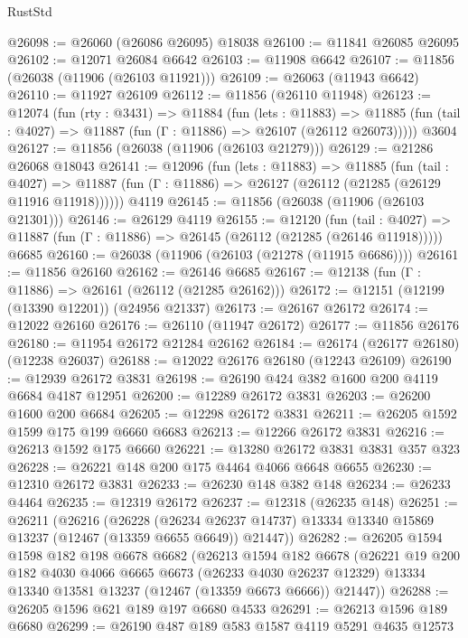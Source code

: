 \begin{lexlean}{RustStd}
\begin{coremodule}
@26098 := @26060 (@26086 @26095) @18038
@26100 := @11841 @26085 @26095
@26102 := @12071 @26084 @6642
@26103 := @11908 @6642
@26107 := @11856 (@26038 (@11906 (@26103 @11921)))
@26109 := @26063 (@11943 @6642)
@26110 := @11927 @26109
@26112 := @11856 (@26110 @11948)
@26123 := @12074
    (fun (rty : @3431) =>
    @11884
      (fun (lets : @11883) =>
      @11885 (fun (tail : @4027) => @11887 (fun (Γ : @11886) => @26107 (@26112 @26073)))))
    @3604
@26127 := @11856 (@26038 (@11906 (@26103 @21279)))
@26129 := @21286 @26068 @18043
@26141 := @12096
    (fun (lets : @11883) =>
    @11885
      (fun (tail : @4027) =>
      @11887 (fun (Γ : @11886) => @26127 (@26112 (@21285 (@26129 @11916 @11918))))))
    @4119
@26145 := @11856 (@26038 (@11906 (@26103 @21301)))
@26146 := @26129 @4119
@26155 := @12120
    (fun (tail : @4027) => @11887 (fun (Γ : @11886) => @26145 (@26112 (@21285 (@26146 @11918)))))
    @6685
@26160 := @26038 (@11906 (@26103 (@21278 (@11915 @6686))))
@26161 := @11856 @26160
@26162 := @26146 @6685
@26167 := @12138 (fun (Γ : @11886) => @26161 (@26112 (@21285 @26162)))
@26172 := @12151 (@12199 (@13390 @12201)) (@24956 @21337)
@26173 := @26167 @26172
@26174 := @12022 @26160
@26176 := @26110 (@11947 @26172)
@26177 := @11856 @26176
@26180 := @11954 @26172 @21284 @26162
@26184 := @26174 (@26177 @26180) (@12238 @26037)
@26188 := @12022 @26176 @26180 (@12243 @26109)
@26190 := @12939 @26172 @3831
@26198 := @26190 @424 @382 @1600 @200 @4119 @6684 @4187 @12951
@26200 := @12289 @26172 @3831
@26203 := @26200 @1600 @200 @6684
@26205 := @12298 @26172 @3831
@26211 := @26205 @1592 @1599 @175 @199 @6660 @6683
@26213 := @12266 @26172 @3831
@26216 := @26213 @1592 @175 @6660
@26221 := @13280 @26172 @3831 @3831 @357 @323
@26228 := @26221 @148 @200 @175 @4464 @4066 @6648 @6655
@26230 := @12310 @26172 @3831
@26233 := @26230 @148 @382 @148
@26234 := @26233 @4464
@26235 := @12319 @26172
@26237 := @12318 (@26235 @148)
@26251 := @26211
    (@26216
      (@26228
        (@26234 @26237 @14737)
        @13334
        @13340
        @15869
        @13237
        (@12467 (@13359 @6655 @6649))
        @21447))
@26282 := @26205
    @1594
    @1598
    @182
    @198
    @6678
    @6682
    (@26213
      @1594
      @182
      @6678
      (@26221
        @19
        @200
        @182
        @4030
        @4066
        @6665
        @6673
        (@26233 @4030 @26237 @12329)
        @13334
        @13340
        @13581
        @13237
        (@12467 (@13359 @6673 @6666))
        @21447))
@26288 := @26205 @1596 @621 @189 @197 @6680 @4533
@26291 := @26213 @1596 @189 @6680
@26299 := @26190 @487 @189 @583 @1587 @4119 @5291 @4635 @12573

\end{coremodule}
\end{lexlean}
